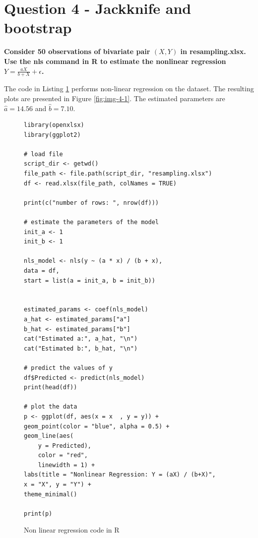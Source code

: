 \documentclass[]{article}
\begin{document}

\section{Question 4 - Jackknife and bootstrap}

\textbf{Consider 50 observations of bivariate pair $(X,Y)$ in resampling.xlsx. Use the nls command in R to estimate the nonlinear regression $Y=\frac{aX}{b+X} + \epsilon$.}

\bigskip

The code in Listing \ref{lst:nls} performs non-linear regression on the dataset. The resulting plots are presented in Figure \ref{fig:img-4-1}. The estimated parameters are $\hat{a} = 14.56$ and $\hat{b} = 7.10$.


\begin{figure}[H]
	\captionsetup{type=lstlisting}
	\begin{lstlisting}
library(openxlsx)
library(ggplot2)

# load file
script_dir <- getwd()
file_path <- file.path(script_dir, "resampling.xlsx")
df <- read.xlsx(file_path, colNames = TRUE)

print(c("number of rows: ", nrow(df)))

# estimate the parameters of the model
init_a <- 1
init_b <- 1

nls_model <- nls(y ~ (a * x) / (b + x),
data = df,
start = list(a = init_a, b = init_b))


estimated_params <- coef(nls_model)
a_hat <- estimated_params["a"]
b_hat <- estimated_params["b"]
cat("Estimated a:", a_hat, "\n")
cat("Estimated b:", b_hat, "\n")

# predict the values of y
df$Predicted <- predict(nls_model)
print(head(df))

# plot the data
p <- ggplot(df, aes(x = x  , y = y)) +
geom_point(color = "blue", alpha = 0.5) +
geom_line(aes(
	y = Predicted),
	color = "red",
	linewidth = 1) +
labs(title = "Nonlinear Regression: Y = (aX) / (b+X)",
x = "X", y = "Y") +
theme_minimal()

print(p)
	\end{lstlisting}
\caption{Non linear regression code in R}
\label{lst:nls}
\end{figure}
\end{document}
